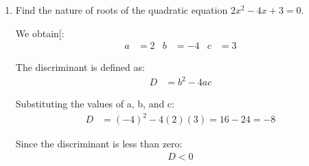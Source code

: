 \begin{enumerate}[label=\thesubsection.\arabic*, ref=\thesubsection.\theenumi]
\begin{center}
   \end{center}
   
   \solution
   In triangle ABC, it is given that DE is parallel to BC. $DE \parallel BC$
   
   By the Basic Proportionality Theorem (Thales' Theorem):
   \begin{align*}
   	\frac{AD}{BD} &= \frac{AE}{CE}
   \end{align*}
   
   Substituting the given values[cite: 5]:
   \begin{align*}
   	\frac{AD}{7.2} &= \frac{1.8}{5.4} &\implies \frac{AD}{7.2} &= \frac{1}{3} &\implies AD &= \frac{7.2}{3} &\implies AD &= 2.4\text{ cm}
   \end{align*}
   
   Therefore, the length of side AD is:
   \begin{align*}
   	AD = 2.4\text{ cm}
   \end{align*}
   
   
   \item Find the nature of roots of the quadratic equation $2x^2 -4x + 3 = 0$.
   
   \solution
  We obtain[:
  \begin{align*}
  	a &= 2 &
  	b &= -4 &
  	c &= 3
  \end{align*}
  
  The discriminant is defined as:
  \begin{align*}
  	D &= b^2 - 4ac
  \end{align*}
  
  Substituting the values of a, b, and c:
  \begin{align*}
  	D &= (-4)^2 - 4(2)(3) 
  	= 16 - 24 
  	= -8
  \end{align*}
  
  Since the discriminant is less than zero:
  \begin{align*}
  	D < 0
  \end{align*}
  

\end{enumerate}
